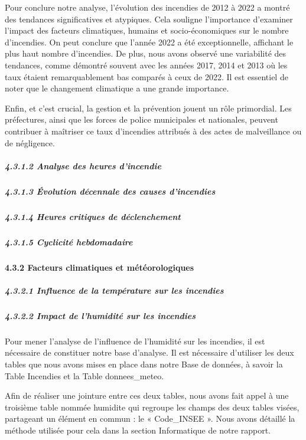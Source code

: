 \documentclass[
]{article}
\begin{document}
Pour conclure notre analyse, l'évolution des incendies de 2012 à 2022 a
montré des tendances significatives et atypiques. Cela souligne
l'importance d'examiner l'impact des facteurs climatiques, humains et
socio-économiques sur le nombre d'incendies. On peut conclure que
l'année 2022 a été exceptionnelle, affichant le plus haut nombre
d'incendies. De plus, nous avons observé une variabilité des tendances,
comme démontré souvent avec les années 2017, 2014 et 2013 où les taux
étaient remarquablement bas comparés à ceux de 2022. Il est essentiel de
noter que le changement climatique a une grande importance.

Enfin, et c'est crucial, la gestion et la prévention jouent un rôle
primordial. Les préfectures, ainsi que les forces de police municipales
et nationales, peuvent contribuer à maîtriser ce taux d'incendies
attribués à des actes de malveillance ou de négligence.

\subparagraph{4.3.1.2 Analyse des heures
d'incendie}\label{analyse-des-heures-dincendie}

\subparagraph{4.3.1.3 Évolution décennale des causes
d'incendies}\label{uxe9volution-duxe9cennale-des-causes-dincendies}

\subparagraph{4.3.1.4 Heures critiques de
déclenchement}\label{heures-critiques-de-duxe9clenchement}

\subparagraph{4.3.1.5 Cyclicité
hebdomadaire}\label{cyclicituxe9-hebdomadaire}

\paragraph{4.3.2 Facteurs climatiques et
météorologiques}\label{facteurs-climatiques-et-muxe9tuxe9orologiques}

\subparagraph{4.3.2.1 Influence de la température sur les
incendies}\label{influence-de-la-tempuxe9rature-sur-les-incendies}

\subparagraph{4.3.2.2 Impact de l'humidité sur les
incendies}\label{impact-de-lhumidituxe9-sur-les-incendies}

Pour mener l'analyse de l'influence de l'humidité sur les incendies, il
est nécessaire de constituer notre base d'analyse. Il est nécessaire
d'utiliser les deux tables que nous avons mises en place dans notre Base
de données, à savoir la Table Incendies et la Table donnees\_meteo.

Afin de réaliser une jointure entre ces deux tables, nous avons fait
appel à une troisième table nommée humidite qui regroupe les champs des
deux tables visées, partageant un élément en commun : le « Code\_INSEE
». Nous avons détaillé la méthode utilisée pour cela dans la section
Informatique de notre rapport.
\end{document}
